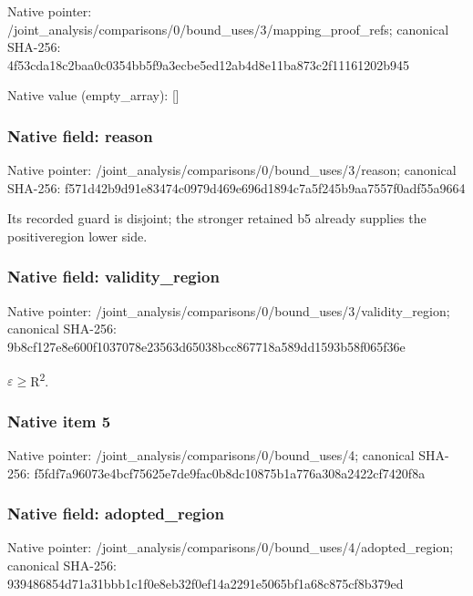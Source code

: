 \documentclass[10pt,a4paper]{article}
\begin{document}
Native pointer: /joint\_analysis/comparis\allowbreak{}ons/0/bound\_uses/3/mappi\allowbreak{}ng\_proof\_refs; canonical SHA-256: 4f53cda18c2baa0c0354bb5f\allowbreak{}9a3ecbe5ed12ab4d8e11ba87\allowbreak{}3c2f11161202b945



Native value (empty\_array): []



\subsubsection{Native field: reason}


Native pointer: /joint\_analysis/comparis\allowbreak{}ons/0/bound\_uses/3/reaso\allowbreak{}n; canonical SHA-256: f571d42b9d91e83474c0979d\allowbreak{}469e696d1894c7a5f245b9aa\allowbreak{}7557f0adf55a9664


Its recorded guard is disjoint; the stronger retained b5 already supplies the positiveregion lower side.


\subsubsection{Native field: validity\_region}


Native pointer: /joint\_analysis/comparis\allowbreak{}ons/0/bound\_uses/3/valid\allowbreak{}ity\_region; canonical SHA-256: 9b8cf127e8e600f1037078e2\allowbreak{}3563d65038bcc867718a589d\allowbreak{}d1593b58f065f36e


\ensuremath{\varepsilon}\ensuremath{\ge}R\textsuperscript{2}.


\subsubsection{Native item 5}


Native pointer: /joint\_analysis/comparis\allowbreak{}ons/0/bound\_uses/4; canonical SHA-256: f5fdf7a96073e4bcf75625e7\allowbreak{}de9fac0b8dc10875b1a776a3\allowbreak{}08a2422cf7420f8a



\subsubsection{Native field: adopted\_region}


Native pointer: /joint\_analysis/comparis\allowbreak{}ons/0/bound\_uses/4/adopt\allowbreak{}ed\_region; canonical SHA-256: 939486854d71a31bbb1c1f0e\allowbreak{}8eb32f0ef14a2291e5065bf1\allowbreak{}a68c875cf8b379ed
\end{document}
